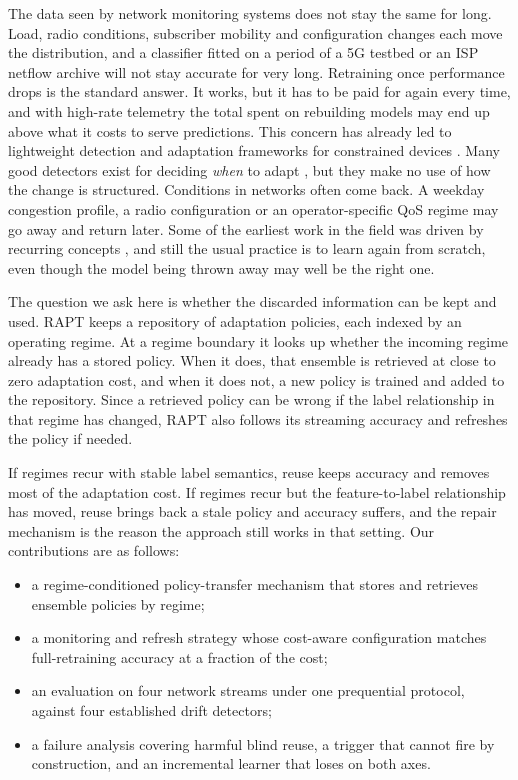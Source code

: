 \documentclass[conference]{IEEEtran}
\begin{document}
The data seen by network monitoring systems does not stay the same for long. Load,
radio conditions, subscriber mobility and configuration changes each move the
distribution, and a classifier fitted on a period of a 5G testbed or an ISP netflow
archive will not stay accurate for very long. Retraining once performance drops is the
standard answer. It works, but it has to be paid for again every time, and with
high-rate telemetry the total spent on rebuilding models may end up above what it costs
to serve predictions. This concern has already led to lightweight detection and
adaptation frameworks for constrained devices \cite{9427288}. Many good detectors exist for deciding \emph{when} to adapt
\cite{bifet2007learning,page1954continuous,gama2004learning,baena2006early,ross2012exponentially,dos2016fast,brockhoff2020time},
but they make no use of how the change is structured. Conditions in networks often come
back. A weekday congestion profile, a radio configuration or an operator-specific QoS
regime may go away and return later. Some of the earliest work in the field was driven
by recurring concepts \cite{schlimmer1986incremental,widmer1994combining}, and still
the usual practice is to learn again from scratch, even though the model being thrown
away may well be the right one.


The question we ask here is whether the discarded information can be kept and used. RAPT
keeps a repository of adaptation policies, each indexed by an operating regime. At a
regime boundary it looks up whether the incoming regime already has a stored policy.
When it does, that ensemble is retrieved at close to zero adaptation cost, and when it
does not, a new policy is trained and added to the repository. Since a retrieved policy
can be wrong if the label relationship in that regime has changed, RAPT also follows
its streaming accuracy and refreshes the policy if needed. 


 If regimes recur with stable label
semantics, reuse keeps accuracy and removes most of the adaptation cost. If regimes
recur but the feature-to-label relationship has moved, reuse brings back a stale policy
and accuracy suffers, and the repair mechanism is the reason the approach still works
in that setting. Our contributions are as follows:
\begin{itemize}
\item a regime-conditioned policy-transfer mechanism that stores and retrieves
ensemble policies by regime;
\item a monitoring and refresh strategy whose cost-aware configuration matches
full-retraining accuracy at a fraction of the cost;
\item an evaluation on four network streams under one prequential protocol,
against four established drift detectors;
\item a failure analysis covering harmful blind reuse, a trigger that cannot fire
by construction, and an incremental learner that loses on both axes.
\end{itemize}
\end{document}
